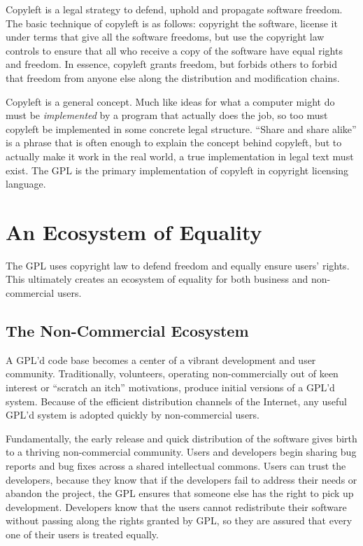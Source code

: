 \documentclass[12pt]{report}
\begin{document}
Copyleft is a legal strategy to defend, uphold and propagate software
freedom.  The basic technique of copyleft is as follows: copyright the
software, license it under terms that give all the software freedoms, but
use the copyright law controls to ensure that all who receive a copy of
the software have equal rights and freedom.  In essence, copyleft grants
freedom, but forbids others to forbid that freedom from anyone else along
the distribution and modification chains.

Copyleft is a general concept.  Much like ideas for what a computer might
do must be \emph{implemented} by a program that actually does the job, so
too must copyleft be implemented in some concrete legal structure.
``Share and share alike'' is a phrase that is often enough to explain the
concept behind copyleft, but to actually make it work in the real world, a
true implementation in legal text must exist.  The GPL is the primary
implementation of copyleft in copyright licensing language.

\section{An Ecosystem of Equality}

The GPL uses copyright law to defend freedom and equally ensure users'
rights.  This ultimately creates an ecosystem of equality for both
business and non-commercial users.

\subsection{The Non-Commercial Ecosystem}

A GPL'd code base becomes a center of a vibrant development and user
community.  Traditionally, volunteers, operating non-commercially out of
keen interest or ``scratch an itch'' motivations, produce initial versions
of a GPL'd system.  Because of the efficient distribution channels of the
Internet, any useful GPL'd system is adopted quickly by non-commercial
users.

Fundamentally, the early release and quick distribution of the software
gives birth to a thriving non-commercial community.  Users and developers
begin sharing bug reports and bug fixes across a shared intellectual
commons.  Users can trust the developers, because they know that if the
developers fail to address their needs or abandon the project, the GPL
ensures that someone else has the right to pick up development.
Developers know that the users cannot redistribute their software without
passing along the rights granted by GPL, so they are assured that every
one of their users is treated equally.
\end{document}
